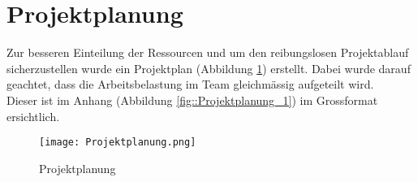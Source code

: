 \section{Projektplanung}

Zur besseren Einteilung der Ressourcen und um den reibungslosen Projektablauf sicherzustellen wurde ein Projektplan (Abbildung \ref{fig::Projektplanung}) erstellt. 
Dabei wurde darauf geachtet, dass die Arbeitsbelastung im Team gleichmässig aufgeteilt wird.\\
Dieser ist im Anhang (Abbildung \ref{fig::Projektplanung_1}) im Grossformat ersichtlich.


\begin{figure}[h] 
\centering
\texttt{[image: Projektplanung.png]}%
\caption{Projektplanung}%
\label{fig::Projektplanung}%
\end{figure}